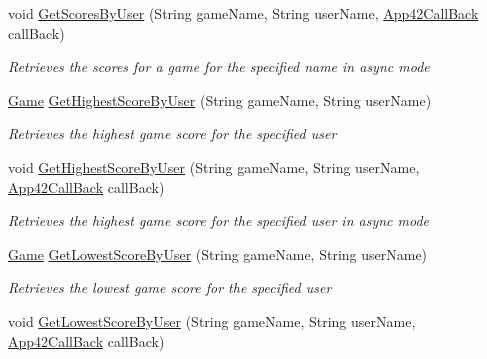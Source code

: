 \begin{DoxyCompactItemize}
void \hyperlink{classcom_1_1shephertz_1_1app42_1_1paas_1_1sdk_1_1csharp_1_1game_1_1_score_board_service_a16d568223246e3cd044367e73f35a519}{Get\+Scores\+By\+User} (String game\+Name, String user\+Name, \hyperlink{interfacecom_1_1shephertz_1_1app42_1_1paas_1_1sdk_1_1csharp_1_1_app42_call_back}{App42\+Call\+Back} call\+Back)
\begin{DoxyCompactList}\small\item\em Retrieves the scores for a game for the specified name in async mode \end{DoxyCompactList}\item 
\hyperlink{classcom_1_1shephertz_1_1app42_1_1paas_1_1sdk_1_1csharp_1_1game_1_1_game}{Game} \hyperlink{classcom_1_1shephertz_1_1app42_1_1paas_1_1sdk_1_1csharp_1_1game_1_1_score_board_service_a5d30a2dd047f9989ecce94d94df84803}{Get\+Highest\+Score\+By\+User} (String game\+Name, String user\+Name)
\begin{DoxyCompactList}\small\item\em Retrieves the highest game score for the specified user \end{DoxyCompactList}\item 
void \hyperlink{classcom_1_1shephertz_1_1app42_1_1paas_1_1sdk_1_1csharp_1_1game_1_1_score_board_service_a724d29237195dabf6ba26ce70635e8ba}{Get\+Highest\+Score\+By\+User} (String game\+Name, String user\+Name, \hyperlink{interfacecom_1_1shephertz_1_1app42_1_1paas_1_1sdk_1_1csharp_1_1_app42_call_back}{App42\+Call\+Back} call\+Back)
\begin{DoxyCompactList}\small\item\em Retrieves the highest game score for the specified user in async mode \end{DoxyCompactList}\item 
\hyperlink{classcom_1_1shephertz_1_1app42_1_1paas_1_1sdk_1_1csharp_1_1game_1_1_game}{Game} \hyperlink{classcom_1_1shephertz_1_1app42_1_1paas_1_1sdk_1_1csharp_1_1game_1_1_score_board_service_a17698b8040c304fc7436a3e485dd127e}{Get\+Lowest\+Score\+By\+User} (String game\+Name, String user\+Name)
\begin{DoxyCompactList}\small\item\em Retrieves the lowest game score for the specified user \end{DoxyCompactList}\item 
void \hyperlink{classcom_1_1shephertz_1_1app42_1_1paas_1_1sdk_1_1csharp_1_1game_1_1_score_board_service_ab1ecbe4366d0b55655d286f60d27a6bb}{Get\+Lowest\+Score\+By\+User} (String game\+Name, String user\+Name, \hyperlink{interfacecom_1_1shephertz_1_1app42_1_1paas_1_1sdk_1_1csharp_1_1_app42_call_back}{App42\+Call\+Back} call\+Back)

\end{DoxyCompactItemize}
